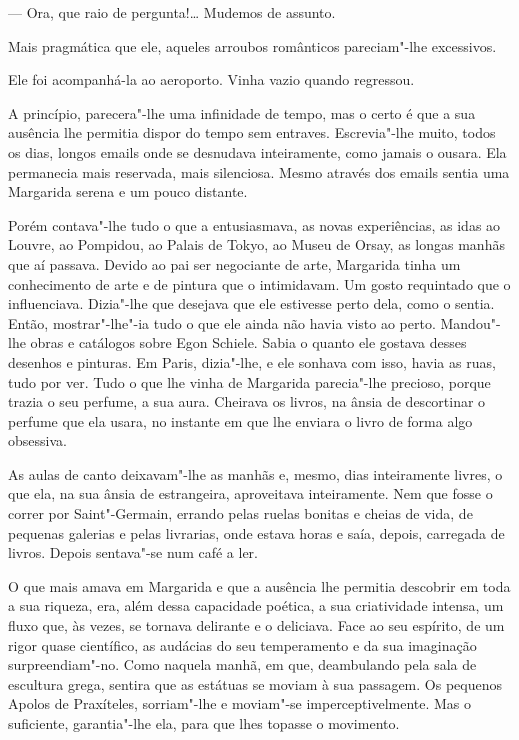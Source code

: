 --- Ora, que raio de pergunta!\ldots{} Mudemos de assunto.

Mais pragmática que ele, aqueles arroubos românticos pareciam"-lhe
excessivos.

Ele foi acompanhá-la ao aeroporto. Vinha vazio quando regressou.

A princípio, parecera"-lhe uma infinidade de tempo, mas o certo é que a
sua ausência lhe permitia dispor do tempo sem entraves. Escrevia"-lhe
muito, todos os dias, longos emails onde se desnudava inteiramente, como
jamais o ousara. Ela permanecia mais reservada, mais silenciosa. Mesmo
através dos emails sentia uma Margarida serena e um pouco distante.

Porém contava"-lhe tudo o que a entusiasmava, as novas experiências, as
idas ao Louvre, ao Pompidou, ao Palais de Tokyo, ao Museu de Orsay, as
longas manhãs que aí passava. Devido ao pai ser negociante de arte,
Margarida tinha um conhecimento de arte e de pintura que o intimidavam.
Um gosto requintado que o influenciava. Dizia"-lhe que desejava que ele
estivesse perto dela, como o sentia. Então, mostrar"-lhe"-ia tudo o que
ele ainda não havia visto ao perto. Mandou"-lhe obras e catálogos sobre
Egon Schiele. Sabia o quanto ele gostava desses desenhos e pinturas. Em
Paris, dizia"-lhe, e ele sonhava com isso, havia as ruas, tudo por ver.
Tudo o que lhe vinha de Margarida parecia"-lhe precioso, porque trazia o
seu perfume, a sua aura. Cheirava os livros, na ânsia de descortinar o
perfume que ela usara, no instante em que lhe enviara o livro de forma
algo obsessiva.

As aulas de canto deixavam"-lhe as manhãs e, mesmo, dias inteiramente
livres, o que ela, na sua ânsia de estrangeira, aproveitava
inteiramente. Nem que fosse o correr por Saint"-Germain, errando pelas
ruelas bonitas e cheias de vida, de pequenas galerias e pelas livrarias,
onde estava horas e saía, depois, carregada de livros. Depois sentava"-se
num café a ler.

O que mais amava em Margarida e que a ausência lhe permitia descobrir em
toda a sua riqueza, era, além dessa capacidade poética, a sua
criatividade intensa, um fluxo que, às vezes, se tornava delirante e o
deliciava. Face ao seu espírito, de um rigor quase científico, as
audácias do seu temperamento e da sua imaginação surpreendiam"-no. Como
naquela manhã, em que, deambulando pela sala de escultura grega, sentira
que as estátuas se moviam à sua passagem. Os pequenos Apolos de
Praxíteles, sorriam"-lhe e moviam"-se imperceptivelmente. Mas o
suficiente, garantia"-lhe ela, para que lhes topasse o movimento.

